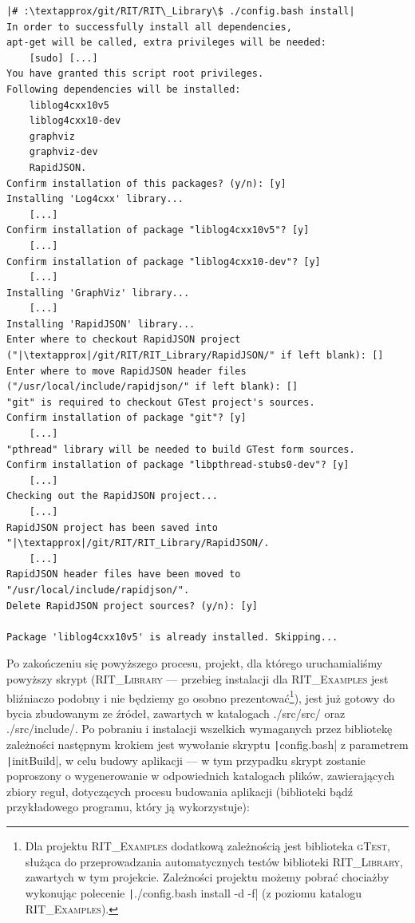 \begin{verbatim}
|# :\textapprox/git/RIT/RIT\_Library\$ ./config.bash install|
In order to successfully install all dependencies,
apt-get will be called, extra privileges will be needed:
	[sudo] [...]
You have granted this script root privileges.
Following dependencies will be installed:
	liblog4cxx10v5
	liblog4cxx10-dev
	graphviz
	graphviz-dev
	RapidJSON.
Confirm installation of this packages? (y/n): [y]
Installing 'Log4cxx' library...
	[...]
Confirm installation of package "liblog4cxx10v5"? [y]
	[...]
Confirm installation of package "liblog4cxx10-dev"? [y]
	[...]
Installing 'GraphViz' library...
	[...]
Installing 'RapidJSON' library...
Enter where to checkout RapidJSON project ("|\textapprox|/git/RIT/RIT_Library/RapidJSON/" if left blank): []
Enter where to move RapidJSON header files ("/usr/local/include/rapidjson/" if left blank): []
"git" is required to checkout GTest project's sources.
Confirm installation of package "git"? [y]
	[...]
"pthread" library will be needed to build GTest form sources.
Confirm installation of package "libpthread-stubs0-dev"? [y]
	[...]
Checking out the RapidJSON project...
	[...]
RapidJSON project has been saved into "|\textapprox|/git/RIT/RIT_Library/RapidJSON/.
	[...]
RapidJSON header files have been moved to "/usr/local/include/rapidjson/".
Delete RapidJSON project sources? (y/n): [y]

Package 'liblog4cxx10v5' is already installed. Skipping...
\end{verbatim}

Po zakończeniu się powyższego procesu, projekt, dla którego uruchamialiśmy powyższy skrypt (\textsc{RIT\_Library} --- przebieg instalacji dla \textsc{RIT\_Examples} jest bliźniaczo podobny i nie będziemy go osobno prezentować\footnote{Dla projektu \textsc{RIT\_Examples} dodatkową zależnością jest biblioteka \textsc{gTest}, służąca do przeprowadzania automatycznych testów biblioteki \textsc{RIT\_Library}, zawartych w tym projekcie. Zależności projektu możemy pobrać chociażby wykonując polecenie \texttt|./config.bash install -d -f| (z poziomu katalogu \textsc{RIT\_Examples}).}), jest już gotowy do bycia zbudowanym ze źródeł, zawartych w katalogach \textsf{./src/src/} oraz \textsf{./src/include/}. Po pobraniu i instalacji wszelkich wymaganych przez bibliotekę zależności następnym krokiem jest wywołanie skryptu \texttt|config.bash| z parametrem \texttt|initBuild|, w celu budowy aplikacji --- w tym przypadku skrypt zostanie poproszony o wygenerowanie w odpowiednich katalogach plików, zawierających zbiory reguł, dotyczących procesu budowania aplikacji (biblioteki bądź przykładowego programu, który ją wykorzystuje):

